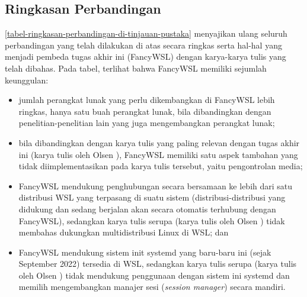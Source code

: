 \subsection{Ringkasan Perbandingan}

\autoref{tabel-ringkasan-perbandingan-di-tinjauan-pustaka} menyajikan ulang seluruh perbandingan yang telah dilakukan di atas secara ringkas serta hal-hal yang menjadi pembeda tugas akhir ini (FancyWSL) dengan karya-karya tulis yang telah dibahas. Pada tabel, terlihat bahwa FancyWSL memiliki sejumlah keunggulan:
\begin{itemize}
    \item jumlah perangkat lunak yang perlu dikembangkan di FancyWSL lebih ringkas, hanya satu buah perangkat lunak, bila dibandingkan dengan penelitian-penelitian lain yang juga mengembangkan perangkat lunak;
    \item bila dibandingkan dengan karya tulis yang paling relevan dengan tugas akhir ini (karya tulis oleh Olsen \cite{olsen-2022-through-the-wormhole}), FancyWSL memiliki satu aspek tambahan yang tidak diimplementasikan pada karya tulis tersebut, yaitu pengontrolan media;
    \item FancyWSL mendukung penghubungan secara bersamaan ke lebih dari satu distribusi WSL yang terpasang di suatu sistem (distribusi-distribusi yang didukung dan sedang berjalan akan secara otomatis terhubung dengan FancyWSL), sedangkan karya tulis serupa (karya tulis oleh Olsen \cite{olsen-2022-through-the-wormhole}) tidak membahas dukungkan multidistribusi Linux di WSL; dan
    \item FancyWSL mendukung sistem init systemd yang baru-baru ini (sejak September 2022) tersedia di WSL, sedangkan karya tulis serupa (karya tulis oleh Olsen \cite{olsen-2022-through-the-wormhole}) tidak mendukung penggunaan dengan sistem ini systemd dan memilih mengembangkan manajer sesi (\textit{session manager}) secara mandiri.
\end{itemize}

